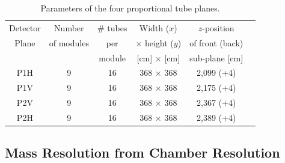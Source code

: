 \begin{table}[bthp]\centering
	\begin{tabular}{c|ccccc}
		\hline \hline
		Detector & Number       & \# tubes     & Width ($x$)               & $z$-position \\
		Plane     & of modules    & per         & $\times$ height ($y$)      & of front (back)   \\ 
		&                & module      & [cm] $\times$ [cm]        & sub-plane    [cm]    \\ 
		\hline
		P1H    &  9     & 16  & 368 $\times$ 368 &  2,099 (+4)    \\
		P1V    &  9     & 16  & 368 $\times$ 368 &  2,175 (+4)    \\
		P2V    &  9     & 16  & 368 $\times$ 368 &  2,367 (+4)    \\
		P2H    &  9        & 16  & 368 $\times$ 368 &  2,389 (+4)    \\
		\hline
		\hline
	\end{tabular}
	\caption{Parameters of the four proportional tube planes.}
	\label{table:prop:param}
\end{table}

\subsection{Mass Resolution from Chamber Resolution}

